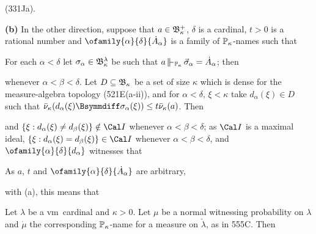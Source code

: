 {\noindent (331Ja).

\medskip

{\bf (b)} In the other direction, suppose that $a\in\frak B_{\kappa}^+$,
$\delta$ is a cardinal, $t>0$ is a rational number
and $\ofamily{\alpha}{\delta}{\dot A_{\alpha}}$ is a family of
$\Bbb P_{\kappa}$-names such that


\noindent For each $\alpha<\delta$ let
$\sigma_{\alpha}\in\frak B_{\kappa}^{\lambda}$ be such that
$a\VVdPk\,\vec\sigma_{\alpha}=\dot A_{\alpha}$;  then


\noindent whenever $\alpha<\beta<\delta$.   Let
$D\subseteq\frak B_{\kappa}$ be a set of size $\kappa$ which is dense for
the measure-algebra topology (521E(a-ii)), and for $\alpha<\delta$,
$\xi<\kappa$ take $d_{\alpha}(\xi)\in D$ such that
$\bar\nu_{\kappa}(d_{\alpha}(\xi)\Bsymmdiff\sigma_{\alpha}(\xi))
\le t\bar\nu_{\kappa}(a)$.   Then


\noindent and $\{\xi:d_{\alpha}(\xi)\ne d_{\beta}(\xi)\}\notin\Cal I$
whenever $\alpha<\beta<\delta$;  as $\Cal I$ is a maximal ideal,
$\{\xi:d_{\alpha}(\xi)=d_{\beta}(\xi)\}\in\Cal I$
whenever $\alpha<\beta<\delta$, and $\ofamily{\alpha}{\delta}{d_{\alpha}}$
witnesses that


\noindent As
$a$, $t$ and $\ofamily{\alpha}{\delta}{\dot A_{\alpha}}$ are arbitrary,


\noindent with (a), this means that

}%

 Let $\lambda$ be a \2vm\ cardinal
and $\kappa>0$.   Let $\mu$ be a normal
witnessing probability on $\lambda$ and
$\dot\mu$ the corresponding $\Bbb P_{\kappa}$-name for a measure on
$\check\lambda$, as in 555C.   Then

